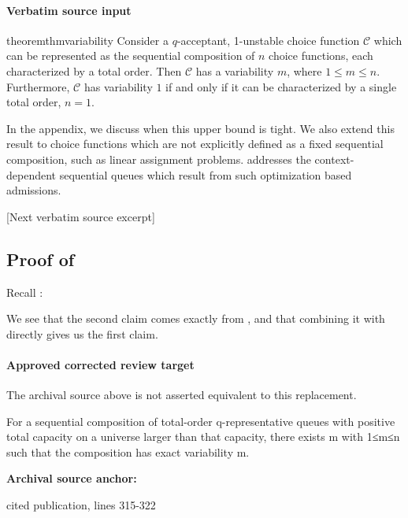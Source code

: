 \documentclass[10pt]{article}
\begin{document}
\paragraph{Verbatim source input}
\begin{ReviewVerbatim}
\begin{restatable}{theorem}{thmvariability}
\label{thm:variability}
Consider a $q$-acceptant, 1-unstable choice function $\mathcal C$ which
can be represented as the sequential composition of $n$ choice functions, each characterized by a total order.
Then $\mathcal C$ has a variability  $m$, where $1 \leq m \leq n$. Furthermore, $\mathcal C$ has variability $1$ if and only if it can be characterized by a single total order, $n=1$.
\end{restatable}
In the appendix, we discuss when this upper bound is tight. We also extend this result to choice functions which are not explicitly defined as a fixed sequential composition, such as linear assignment problems.
 addresses the context-dependent sequential queues which result from such optimization based admissions.

[Next verbatim source excerpt]

\subsection{Proof of } \label{sec:variability-proof}

Recall :
\thmvariability*

We see that the second claim comes exactly from , and that combining it with  directly gives us the first claim.
\end{ReviewVerbatim}

\paragraph{Approved corrected review target}
The archival source above is not asserted equivalent to this replacement.
\begin{ReviewVerbatim}
For a sequential composition of total-order q-representative queues with positive total capacity on a universe larger than that capacity, there exists m with 1≤m≤n such that the composition has exact variability m.
\end{ReviewVerbatim}

\textbf{Archival source anchor:} {\footnotesize\raggedright cited publication, lines 315-\allowbreak{}322\par}
\end{document}
